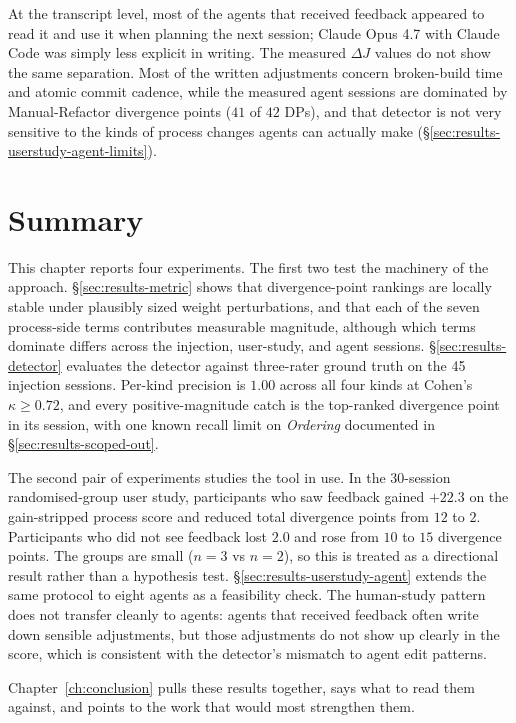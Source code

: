 At the transcript level, most of the agents that received feedback appeared to read it and use it when planning the next session; Claude Opus 4.7 with Claude Code was simply less explicit in writing. The measured $\Delta J$ values do not show the same separation. Most of the written adjustments concern broken-build time and atomic commit cadence, while the measured agent sessions are dominated by Manual-Refactor divergence points ($41$ of $42$ DPs), and that detector is not very sensitive to the kinds of process changes agents can actually make (\S\ref{sec:results-userstudy-agent-limits}).

\section{Summary}
\label{sec:results-summary}

This chapter reports four experiments. The first two test the machinery of the approach. \S\ref{sec:results-metric} shows that divergence-point rankings are locally stable under plausibly sized weight perturbations, and that each of the seven process-side terms contributes measurable magnitude, although which terms dominate differs across the injection, user-study, and agent sessions. \S\ref{sec:results-detector} evaluates the detector against three-rater ground truth on the 45 injection sessions. Per-kind precision is $1.00$ across all four kinds at Cohen's $\kappa \geq 0.72$, and every positive-magnitude catch is the top-ranked divergence point in its session, with one known recall limit on \emph{Ordering} documented in \S\ref{sec:results-scoped-out}.

The second pair of experiments studies the tool in use. In the 30-session randomised-group user study, participants who saw feedback gained $+22.3$ on the gain-stripped process score and reduced total divergence points from $12$ to $2$. Participants who did not see feedback lost $2.0$ and rose from $10$ to $15$ divergence points. The groups are small ($n = 3$ vs $n = 2$), so this is treated as a directional result rather than a hypothesis test. \S\ref{sec:results-userstudy-agent} extends the same protocol to eight agents as a feasibility check. The human-study pattern does not transfer cleanly to agents: agents that received feedback often write down sensible adjustments, but those adjustments do not show up clearly in the score, which is consistent with the detector's mismatch to agent edit patterns.

Chapter~\ref{ch:conclusion} pulls these results together, says what to read them against, and points to the work that would most strengthen them.